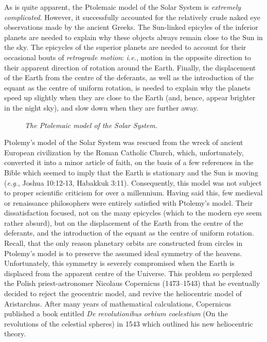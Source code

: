 As is quite apparent, the Ptolemaic model of the Solar System is {\em extremely complicated}. 
However, it successfully accounted for the relatively
crude
 naked eye observations made by the ancient Greeks. The Sun-linked epicyles of the
inferior planets are needed to explain why these objects always remain close to the
Sun in the sky. The epicycles of the superior planets are needed to account for
their occasional bouts of {\em retrograde motion}: {\em i.e.}, motion in the opposite
direction to their apparent direction of rotation around the Earth. Finally, the
displacement of the Earth from the centre of the deferants, as well as the introduction
of the equant as the centre of uniform rotation, is needed to explain why the planets
speed up slightly when they are close to the Earth (and, hence, appear
brighter in the night sky), and slow down when they are further away.

\begin{figure}
\epsfysize=5.5in
\centerline{}
\caption{\em The Ptolemaic model of the Solar System.}\label{f102}  
\end{figure}

Ptolemy's model of the Solar System was rescued from the wreck of ancient European civilization
by the Roman Catholic Church, which, unfortunately, converted it into a minor article
of faith, on the basis of a few references in the Bible which seemed to imply that the Earth is
stationary and the Sun is moving ({\em e.g.}, Joshua 10:12-13, Habakkuk 3:11). 
Consequently, this model was not subject to proper scientific criticism for over a
millennium. Having said this, few medieval or renaissance philosophers were entirely satisfied with
Ptolemy's model. Their dissatisfaction focused, not on the many epicycles (which to the
modern eye seem rather absurd), but on the displacement of the Earth from the
centre of the deferants, and the introduction of the equant as the centre of uniform
rotation. Recall, that the only reason  planetary orbits are constructed from circles
in Ptolemy's model is to preserve the assumed ideal symmetry of the heavens. Unfortunately,
this symmetry is severely compromised when the Earth is displaced from the
apparent centre of the Universe. This problem so perplexed the Polish priest-astronomer 
Nicolaus Copernicus (1473--1543) that he eventually decided to reject the geocentric
model, and revive the heliocentric model of Aristarchus. After many years of mathematical
calculations, Copernicus published a book entitled {\em De revolutionibus orbium coelestium}
(On the revolutions of the celestial spheres) in 1543 which outlined his new heliocentric
theory.

